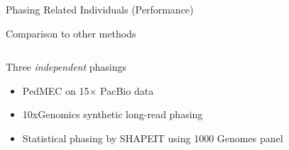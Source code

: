 \documentclass[notes=hide]{beamer}
\begin{document}
\begin{frame}{Phasing Related Individuals (Performance)}
\begin{center}
\end{center} %
\end{frame}

\begin{frame}{Comparison to other methods}
\begin{columns}
\begin{column}{.55\textwidth}
\begin{block}{Three \emph{independent} phasings}
\begin{itemize}
 \item PedMEC on 15$\times$ PacBio data
 \item 10xGenomics synthetic long-read phasing
 \item Statistical phasing by SHAPEIT using 1000 Genomes panel
\end{itemize}
\end{block}
\end{column}
\begin{column}{.45\textwidth}
\begin{center}

\end{center}
\end{column}
\end{columns}
\end{frame}
\end{document}
